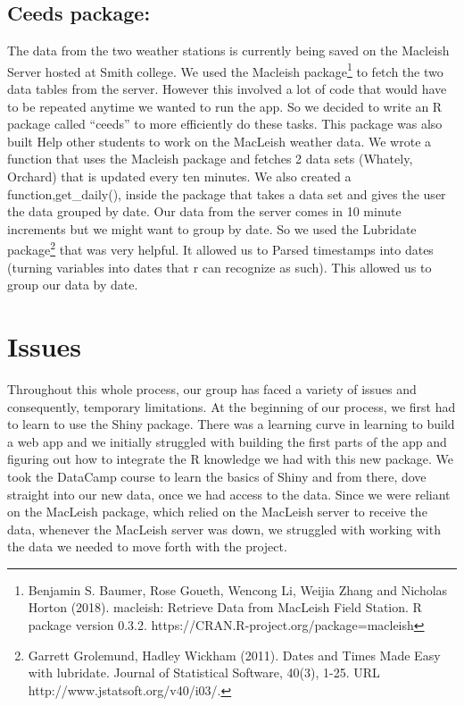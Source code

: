 \documentclass[10pt,letterpaper]{article}
\begin{document}
\subsection{Ceeds package:}\label{ceeds-package}

The data from the two weather stations is currently being saved on the
Macleish Server hosted at Smith college. We used the Macleish
package\footnote{Benjamin S. Baumer, Rose Goueth, Wencong Li, Weijia
  Zhang and Nicholas Horton (2018). macleish: Retrieve Data from
  MacLeish Field Station. R package version 0.3.2.
  https://CRAN.R-project.org/package=macleish} to fetch the two data
tables from the server. However this involved a lot of code that would
have to be repeated anytime we wanted to run the app. So we decided to
write an R package called ``ceeds'' to more efficiently do these tasks.
This package was also built Help other students to work on the MacLeish
weather data. We wrote a function that uses the Macleish package and
fetches 2 data sets (Whately, Orchard) that is updated every ten
minutes. We also created a function,get\_daily(), inside the package
that takes a data set and gives the user the data grouped by date. Our
data from the server comes in 10 minute increments but we might want to
group by date. So we used the Lubridate package\footnote{Garrett
  Grolemund, Hadley Wickham (2011). Dates and Times Made Easy with
  lubridate. Journal of Statistical Software, 40(3), 1-25. URL
  http://www.jstatsoft.org/v40/i03/.} that was very helpful. It allowed
us to Parsed timestamps into dates (turning variables into dates that r
can recognize as such). This allowed us to group our data by date.

\section{Issues}\label{issues}

Throughout this whole process, our group has faced a variety of issues
and consequently, temporary limitations. At the beginning of our
process, we first had to learn to use the Shiny package. There was a
learning curve in learning to build a web app and we initially struggled
with building the first parts of the app and figuring out how to
integrate the R knowledge we had with this new package. We took the
DataCamp course to learn the basics of Shiny and from there, dove
straight into our new data, once we had access to the data. Since we
were reliant on the MacLeish package, which relied on the MacLeish
server to receive the data, whenever the MacLeish server was down, we
struggled with working with the data we needed to move forth with the
project.
\end{document}
